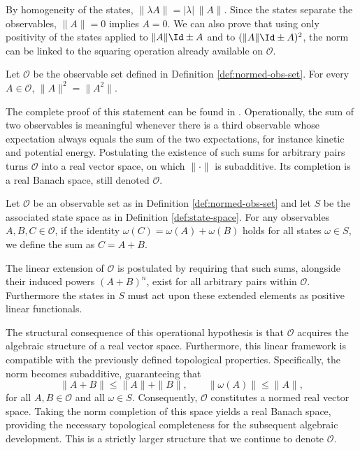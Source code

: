 By homogeneity of the states, $\|\lambda A\|=|\lambda|\,\|A\|$. Since the states separate
the observables, $\|A\|=0$ implies $A=0$. We can also prove that using only
positivity of the states applied to $\|A\| \Id \pm A$ and to
$(\|A\| \Id \pm A)^2$, the norm can be linked to the squaring operation already
available on $\mathcal{O}$.

\begin{proposition}\label{prop:comp-squares}
	Let $\mathcal{O}$ be the observable set defined in Definition \ref{def:normed-obs-set}. For every $A\in\mathcal{O}$, $\|A\|^2=\|A^2\|$.
\end{proposition}

The complete proof of this statement can be found in \cite[p.18]{strocchiIntroductionMathematicalStructure2005}. Operationally, the sum of two observables is meaningful whenever there is
a third observable whose expectation always equals the sum of the two
expectations, for instance kinetic and potential energy. Postulating the
existence of such sums for arbitrary pairs turns $\mathcal{O}$ into a real
vector space, on which $\|\cdot\|$ is subadditive. Its completion is a real
Banach space, still denoted $\mathcal{O}$.

\begin{definition}
	Let $\mathcal{O}$ be an observable set as in Definition \ref{def:normed-obs-set} and let $S$ be the associated state space as in Definition \ref{def:state-space}. For any observables $A,B,C \in \mathcal{O}$, if the identity $\omega(C)=\omega(A)+\omega(B)$ holds for all states $\omega \in S$, we define the sum as $C=A+B$. 
	
	The linear extension of $\mathcal{O}$ is postulated by requiring that such sums, alongside their induced powers $(A+B)^n$, exist for all arbitrary pairs within $\mathcal{O}$. Furthermore the states in $S$ must act upon these extended elements as positive linear functionals.
\end{definition}

The structural consequence of this operational hypothesis is that $\mathcal{O}$ acquires the algebraic structure of a real vector space. Furthermore, this linear framework is compatible with the previously defined topological properties. Specifically, the norm becomes subadditive, guaranteeing that
$$\|A+B\| \le \|A\| + \|B\|, \qquad \|\omega(A)\| \le \|A\|,$$
for all $A, B \in \mathcal{O}$ and all $\omega \in S$. Consequently, $\mathcal{O}$ constitutes a normed real vector space. Taking the norm completion of this space yields a real Banach space, providing the necessary topological completeness for the subsequent algebraic development. This is a strictly larger structure that we continue to denote $\mathcal{O}$.

